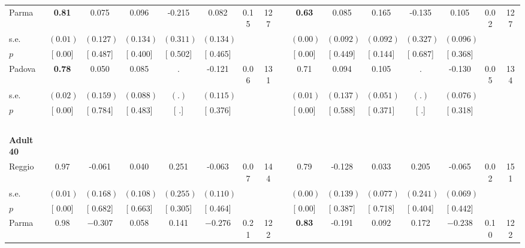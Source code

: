 \begin{longtable}{L{8em} c c c c c c c p{1em} c c c c c c c}
\quad \quad \quad Parma& \textbf{     0.81} &     0.075 &     0.096 &    -0.215 &     0.082 &      0.15 &       127 & & \textbf{     0.63} &     0.085 &     0.165 &    -0.135 &     0.105 &      0.02 &       127  \\*
\quad \quad \quad \quad s.e.& $ (     0.01)$ & $ (    0.127)$ & $ (    0.134)$ & $ (    0.311)$ & $ (    0.134)$ & & & & $ (     0.00)$ & $ (    0.092)$ & $ (    0.092)$ & $ (    0.327)$ & $ (    0.096)$ & &  \\*
\quad \quad \quad \quad $ p$ & [     0.00] & [    0.487] & [    0.400] & [    0.502] & [    0.465] & & & & [     0.00] & [    0.449] & [    0.144] & [    0.687] & [    0.368] & &  \\[1em]
\quad \quad \quad Padova& \textbf{     0.78} &     0.050 &     0.085 &         . &    -0.121 &      0.06 &       131 & & 0.71 &     0.094 &     0.105 &         . &    -0.130 &      0.05 &       134  \\*
\quad \quad \quad \quad s.e.& $ (     0.02)$ & $ (    0.159)$ & $ (    0.088)$ & $ (        .)$ & $ (    0.115)$ & & & & $ (     0.01)$ & $ (    0.137)$ & $ (    0.051)$ & $ (        .)$ & $ (    0.076)$ & &  \\*
\quad \quad \quad \quad $ p$ & [     0.00] & [    0.784] & [    0.483] & [        .] & [    0.376] & & & & [     0.00] & [    0.588] & [    0.371] & [        .] & [    0.318] & &  \\[1em]
~\\[1em]
\quad \quad \textbf{Adult 40} & & & & & & & & & & & & & & & \\* 
\quad \quad \quad Reggio& 0.97 &    -0.061 &     0.040 &     0.251 &    -0.063 &      0.07 &       144 & & 0.79 &    -0.128 &     0.033 &     0.205 &    -0.065 &      0.02 &       151  \\*
\quad \quad \quad \quad s.e.& $ (     0.01)$ & $ (    0.168)$ & $ (    0.108)$ & $ (    0.255)$ & $ (    0.110)$ & & & & $ (     0.00)$ & $ (    0.139)$ & $ (    0.077)$ & $ (    0.241)$ & $ (    0.069)$ & &  \\*
\quad \quad \quad \quad $ p$ & [     0.00] & [    0.682] & [    0.663] & [    0.305] & [    0.464] & & & & [     0.00] & [    0.387] & [    0.718] & [    0.404] & [    0.442] & &  \\[1em]
\quad \quad \quad Parma& 0.98 & $ \mathbf{   -0.307}$ &     0.058 &     0.141 & $ \mathbf{   -0.276}$ &      0.21 &       122 & & \textbf{     0.83} &    -0.191 &     0.092 &     0.172 & $ \mathbf{   -0.238}$ &      0.10 &       122  \\*

\end{longtable}
